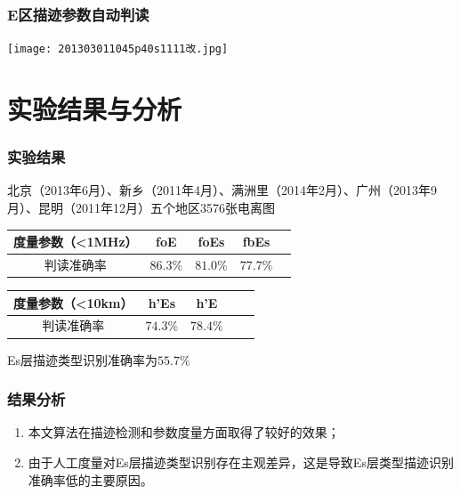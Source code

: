 \documentclass[notheorems,mathserif,table,compress]{beamer}  %
\begin{document}
\begin{frame}
\frametitle{ E区描迹参数自动判读}
\centering\texttt{[image: 201303011045p40s1111改.jpg]}
\end{frame}


\section{实验结果与分析}
\begin{frame}
\frametitle{实验结果}
\begin{tcolorbox}[colback=blue!5,colframe=blue!75!black,title=测试数据集]
北京（2013年6月）、新乡（2011年4月）、满洲里（2014年2月）、广州（2013年9月）、昆明（2011年12月）五个地区3576张电离图
\end{tcolorbox}
\begin{tcolorbox}[colback=blue!5,colframe=blue!75!black]
\begin{table}[!ht]
\begin{tabular}{|c|c|c|c|c|}
\hline
度量参数（<1MHz）& foE & foEs & fbEs  \\
\hline
判读准确率 & $86.3\%$ & $81.0\%$ & $77.7\%$  \\
\hline
\end{tabular}
\end{table}
\vspace{-1em}
\begin{table}[!ht]
\begin{tabular}{|c|c|c|c|c|}
\hline
度量参数（<10km）& h'Es & h'E \\
\hline
判读准确率& $74.3\%$ & $78.4\%$\\
\hline
\end{tabular}
\vspace{-1em}
\end{table}
\end{tcolorbox}
\begin{tcolorbox}[colback=blue!5,colframe=blue!75!black]
 Es层描迹类型识别准确率为$55.7\%$
\vspace{-1em}
\end{tcolorbox}
\end{frame}


\begin{frame}
\frametitle{结果分析}
 \begin{enumerate}
  \item 本文算法在描迹检测和参数度量方面取得了较好的效果；
  \item 由于人工度量对Es层描迹类型识别存在主观差异，这是导致Es层类型描迹识别准确率低的主要原因。
  \end{enumerate}
  \end{frame}
\end{document}
